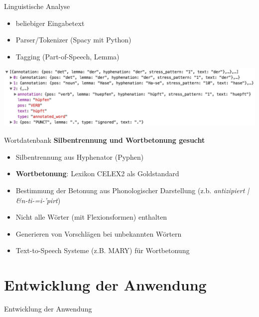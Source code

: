 \documentclass{beamer}
\begin{document}
\begin{frame}{Linguistische Analyse}
\begin{itemize}
	\item beliebiger Eingabetext
	\item Parser/Tokenizer (Spacy mit Python)
	\item Tagging (Part-of-Speech, Lemma)
\end{itemize}
\vfill
\centering
\includegraphics[width=1.05\textwidth]{../figures/json}
\end{frame}

\begin{frame}{Wortdatenbank}
\textbf{Silbentrennung und Wortbetonung gesucht}
\begin{itemize}
	\item Silbentrennung aus Hyphenator (Pyphen)
	\item \textbf{Wortbetonung}: Lexikon CELEX2 als Goldstandard
	\item Bestimmung der Betonung aus Phonologischer Darstellung (z.b. \textit{antizipiert | \&n-ti-=i-'pirt})
	\item Nicht alle Wörter (mit Flexionsformen) enthalten
	\item Generieren von Vorschlägen bei unbekannten Wörtern
	\item Text-to-Speech Systeme (z.B. MARY) für Wortbetonung
\end{itemize}
\end{frame}

\section{Entwicklung der Anwendung}
\begin{frame}
\centering
\huge{Entwicklung der Anwendung}
\end{frame}
\end{document}
